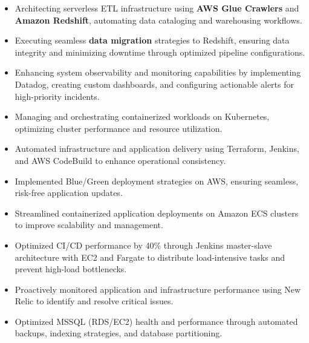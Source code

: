 \documentclass[10pt,a4paper,ragged2e,withhyper]{altacv}
\begin{document}


\makecvheader



\begin{itemize}
    \item Architecting serverless ETL infrastructure using \textbf{AWS Glue Crawlers} and \textbf{Amazon Redshift}, automating data cataloging and warehousing workflows.
    \item Executing seamless \textbf{data migration} strategies to Redshift, ensuring data integrity and minimizing downtime through optimized pipeline configurations.
    \item Enhancing system observability and monitoring capabilities by implementing Datadog, creating custom dashboards, and configuring actionable alerts for high-priority incidents.
    \item Managing and orchestrating containerized workloads on Kubernetes, optimizing cluster performance and resource utilization.
\end{itemize}

\divider

\begin{itemize}
    \item Automated infrastructure and application delivery using Terraform, Jenkins, and AWS CodeBuild to enhance operational consistency.
    \item Implemented Blue/Green deployment strategies on AWS, ensuring seamless, risk-free application updates.
    \item Streamlined containerized application deployments on Amazon ECS clusters to improve scalability and management.
    \item Optimized CI/CD performance by 40\% through Jenkins master-slave architecture with EC2 and Fargate to distribute load-intensive tasks and prevent high-load bottlenecks.
    \item Proactively monitored application and infrastructure performance using New Relic to identify and resolve critical issues.
    \item Optimized MSSQL (RDS/EC2) health and performance through automated backups, indexing strategies, and database partitioning.
\end{itemize}
\end{document}
